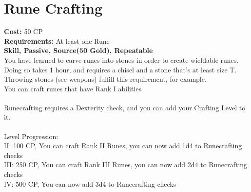 \section{Rune Crafting}\label{perk:runecrafting}
\textbf{Cost:} 50 CP\\
\textbf{Requirements:} At least one Rune\\
\textbf{Skill, Passive, Source(50 Gold), Repeatable}\\
You have learned to carve runes into stones in order to create wieldable runes.\\
Doing so takes 1 hour, and requires a chisel and a stone that's at least size T.
Throwing stones (see weapons) fulfill this requirement, for example.\\
You can craft runes that have Rank I abilities\\
\\
Runecrafting requires a Dexterity check, and you can add your Crafting Level to it.\\
\\
Level Progression:\\
II: 100 CP, You can craft Rank II Runes, you can now add 1d4 to Runecrafting checks\\
III: 250 CP, You can craft Rank III Runes, you can now add 2d4 to Runecrafting checks\\
IV: 500 CP, You can now add 3d4 to Runecrafting checks\\